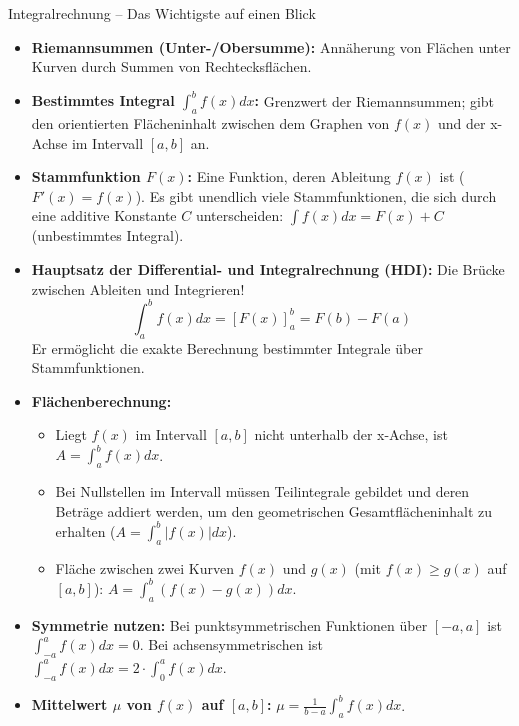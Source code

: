 \begin{kurzknappumgebung}{Integralrechnung – Das Wichtigste auf einen Blick}
\begin{itemize}
    \item \textbf{Riemannsummen (Unter-/Obersumme):} Annäherung von Flächen unter Kurven durch Summen von Rechtecksflächen.
    \item \textbf{Bestimmtes Integral $\int_a^b f(x)dx$:} Grenzwert der Riemannsummen; gibt den orientierten Flächeninhalt zwischen dem Graphen von $f(x)$ und der x-Achse im Intervall $[a,b]$ an.
    \item \textbf{Stammfunktion $F(x)$:} Eine Funktion, deren Ableitung $f(x)$ ist ($F'(x)=f(x)$). Es gibt unendlich viele Stammfunktionen, die sich durch eine additive Konstante $C$ unterscheiden: $\int f(x)dx = F(x)+C$ (unbestimmtes Integral).
    \item \textbf{Hauptsatz der Differential- und Integralrechnung (HDI):} Die Brücke zwischen Ableiten und Integrieren!
    \[ \int_a^b f(x)dx = [F(x)]_a^b = F(b) - F(a) \]
    Er ermöglicht die exakte Berechnung bestimmter Integrale über Stammfunktionen.
    \item \textbf{Flächenberechnung:}
        \begin{itemize}
            \item Liegt $f(x)$ im Intervall $[a,b]$ nicht unterhalb der x-Achse, ist $A = \int_a^b f(x)dx$.
            \item Bei Nullstellen im Intervall müssen Teilintegrale gebildet und deren Beträge addiert werden, um den geometrischen Gesamtflächeninhalt zu erhalten ($A = \int_a^b |f(x)|dx$).
            \item Fläche zwischen zwei Kurven $f(x)$ und $g(x)$ (mit $f(x) \ge g(x)$ auf $[a,b]$): $A = \int_a^b (f(x)-g(x))dx$.
        \end{itemize}
    \item \textbf{Symmetrie nutzen:} Bei punktsymmetrischen Funktionen über $[-a,a]$ ist $\int_{-a}^a f(x)dx = 0$. Bei achsensymmetrischen ist $\int_{-a}^a f(x)dx = 2 \cdot \int_0^a f(x)dx$.
    \item \textbf{Mittelwert $\mu$ von $f(x)$ auf $[a,b]$:} $\mu = \frac{1}{b-a}\int_a^b f(x)dx$.
\end{itemize}
\end{kurzknappumgebung}

